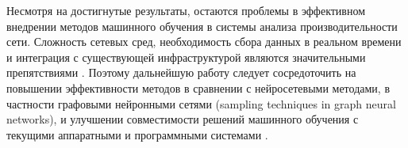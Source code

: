 

Несмотря на достигнутые результаты, остаются проблемы в эффективном внедрении методов машинного обучения в системы анализа производительности сети. Сложность сетевых сред, необходимость сбора данных в реальном времени и интеграция с существующей инфраструктурой являются значительными препятствиями \cite{Ouedraogo2022Adaptive, Mai2015Optimizing}. Поэтому дальнейшую работу следует сосредоточить на повышении эффективности методов в сравнении с нейросетевыми методами, в частности графовыми нейронными сетями  (sampling techniques in graph neural networks), и улучшении совместимости решений машинного обучения с текущими аппаратными и программными системами \cite{Mai2015Optimizing, Wang2021Empirical}.


